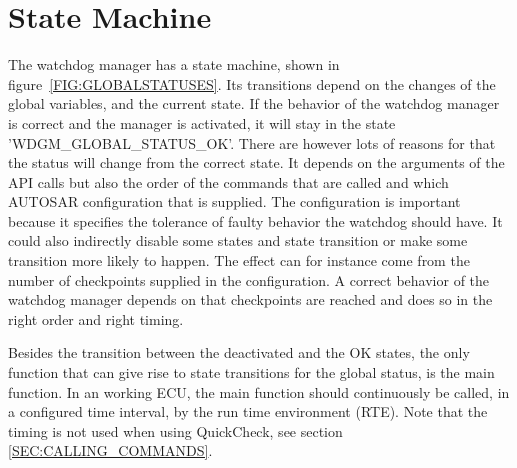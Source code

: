 
\section{State Machine}
The watchdog manager has a state machine, shown in
figure~\ref{FIG:GLOBALSTATUSES}. Its transitions depend on the changes of the
global variables, and the current state. If the behavior of the watchdog manager
is correct and the manager is activated, it will stay in the state
'WDGM\_GLOBAL\_STATUS\_OK'. There are however lots of reasons for that the
status will change from the correct state. It depends on the arguments of the
API calls but also the order of the commands that are called and which AUTOSAR
configuration that is supplied. The configuration is important because it
specifies the tolerance of faulty behavior the watchdog should have. It could
also indirectly disable some states and state transition or make some transition
more likely to happen. The effect can for instance come from the number of
checkpoints supplied in the configuration. A correct behavior of the watchdog
manager depends on that checkpoints are reached and does so in the right order
and right timing.

Besides the transition between the deactivated and the OK states, the only
function that can give rise to state transitions for the global status, is the
main function. In an working ECU, the main function should continuously be
called, in a configured time interval, by the run time environment (RTE). Note
that the timing is not used when using QuickCheck, see section
\ref{SEC:CALLING_COMMANDS}.

